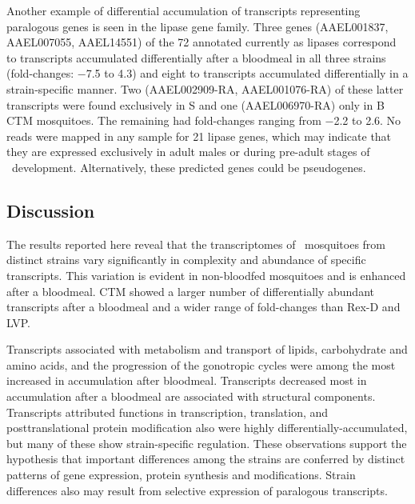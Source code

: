 Another example of differential accumulation of transcripts representing paralogous genes is seen in the lipase gene family.
Three genes (AAEL001837, AAEL007055, AAEL14551) of the 72 annotated currently as lipases correspond to transcripts accumulated differentially after a bloodmeal in all three strains (fold-changes: −7.5 to 4.3) and eight to transcripts accumulated differentially in a strain-specific manner.
Two (AAEL002909-RA, AAEL001076-RA) of these latter transcripts were found exclusively in S and one (AAEL006970-RA) only in B \gls{CTM} mosquitoes.
The remaining had fold-changes ranging from −2.2 to 2.6.
No reads were mapped in any sample for 21 lipase genes, which may indicate that they are expressed exclusively in adult males or during pre-adult stages of \Aa\ development.
Alternatively, these predicted genes could be pseudogenes.



\subsection{Discussion}
The results reported here reveal that the transcriptomes of \Aa\ mosquitoes from distinct strains vary significantly in complexity and abundance of specific transcripts.
This variation is evident in non-bloodfed mosquitoes and is enhanced after a bloodmeal.
\gls{CTM} showed a larger number of differentially abundant transcripts after a bloodmeal and a wider range of fold-changes than \gls{Rex-D} and \gls{LVP}.


Transcripts associated with metabolism and transport of lipids, carbohydrate and amino acids, and the progression of the gonotropic cycles were among the most increased in accumulation after bloodmeal.
Transcripts decreased most in accumulation after a bloodmeal are associated with structural components.
Transcripts attributed functions in transcription, translation, and posttranslational protein modification also were highly differentially-accumulated, but many of these show strain-specific regulation.
These observations support the hypothesis that important differences among the strains are conferred by distinct patterns of gene expression, protein synthesis and modifications.
Strain differences also may result from selective expression of paralogous transcripts.



